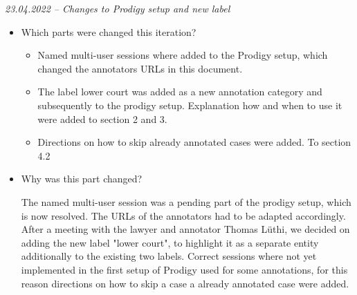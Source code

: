 \documentclass{article}
\begin{document}
\begin{mdframed}
\emph{23.04.2022 – Changes to Prodigy setup and new label}
\begin{itemize}
	\item Which parts were changed this iteration? 
	\begin{itemize}
	    \item Named multi-user sessions where added to the Prodigy setup, which changed the annotators URLs in this document.
	    \item The label lower court was added as a new annotation category and subsequently to the prodigy setup. Explanation how and when to use it were added to section 2 and 3.
	    \item Directions on how to skip already annotated cases were added. To section 4.2
	\end{itemize} 
    \item Why was this part changed?
    
    The named multi-user session was a pending part of the prodigy setup, which is now resolved. The URLs of the annotators had to be adapted accordingly. After a meeting with the lawyer and annotator Thomas Lüthi, we decided on adding the new label "lower court", to highlight it as a separate entity additionally to the existing two labels. 
    Correct sessions where not yet implemented in the first setup of Prodigy used for some annotations, for this reason directions on how to skip a case a already annotated case were added.
    
\end{itemize}
\end{mdframed}
\pagebreak
\end{document}
